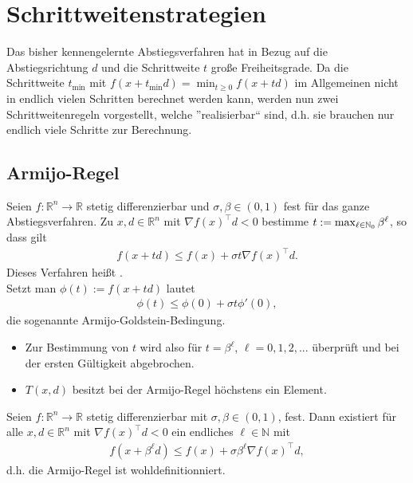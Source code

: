 \newcommand{\nat}{\mathbb{N}}				%
\newcommand{\integer}{\mathbb{Z}}			%
\newcommand{\ratio}{\mathbb{Q}}
\newcommand{\real}{\mathbb{R}}				%
\newcommand{\complex}{\mathbb{C}}			%
\newcommand{\korper}{\mathbb{K}}            %


\chapter{Schrittweitenstrategien}


Das bisher kennengelernte Abstiegsverfahren hat in Bezug auf die Abstiegsrichtung $d$ und die Schrittweite $t$ große Freiheitsgrade. Da die Schrittweite $t_{\min}$ mit $f(x+t_{\min}d) = \min_{t\geq 0} f(x+td)$ im Allgemeinen nicht in endlich vielen Schritten berechnet werden kann, werden nun zwei Schrittweitenregeln vorgestellt, welche ''realisierbar`` sind, d.h. sie brauchen nur endlich viele Schritte zur Berechnung.


\section{Armijo-Regel}

\begin{definition}
	Seien $f: \real^n \to \real$ stetig differenzierbar und $\sigma, \beta \in (0,1)$ fest für das ganze Abstiegsverfahren. Zu $x, d \in \real^n$ mit $\nabla f(x)^{\top} d<0$ bestimme $t \defeq \max_{\ell \in \nat_0} \beta^\ell$, so dass gilt 
	\begin{align}
		f(x+td) \leq f(x) + \sigma t \nabla f(x)^{\top} d.  \label{armijo}
	\end{align}	 
	Dieses Verfahren heißt . \\
	Setzt man $\phi(t) := f(x+td)$ lautet  
	\begin{align*}
		\phi(t) \leq \phi (0) + \sigma t \phi' (0),
	\end{align*}
	die sogenannte Armijo-Goldstein-Bedingung.
\end{definition}

\begin{bemerkung}
	\begin{itemize}	
		\item Zur Bestimmung von $t$ wird  also für $t= \beta^\ell$, $\ell=0,1,2,...$ überprüft und bei der ersten Gültigkeit abgebrochen.
		\item $T(x,d)$ besitzt bei der Armijo-Regel höchstens ein Element.
	\end{itemize}
\end{bemerkung}
\begin{satz}
	Seien $f: \real^n \to \real$ stetig differenzierbar mit $\sigma , \beta \in (0,1)$, fest. Dann existiert für alle $x,d \in \real^n$ mit $\nabla f(x)^{\top} d < 0$ ein endliches $\ell \in \nat$ mit
	\begin{align*}
		f(x+ \beta^\ell d) \leq f(x)+ \sigma \beta^\ell \nabla f(x)^{\top} d, 
	\end{align*}
	d.h. die Armijo-Regel ist wohldefinitionniert.
\end{satz}

